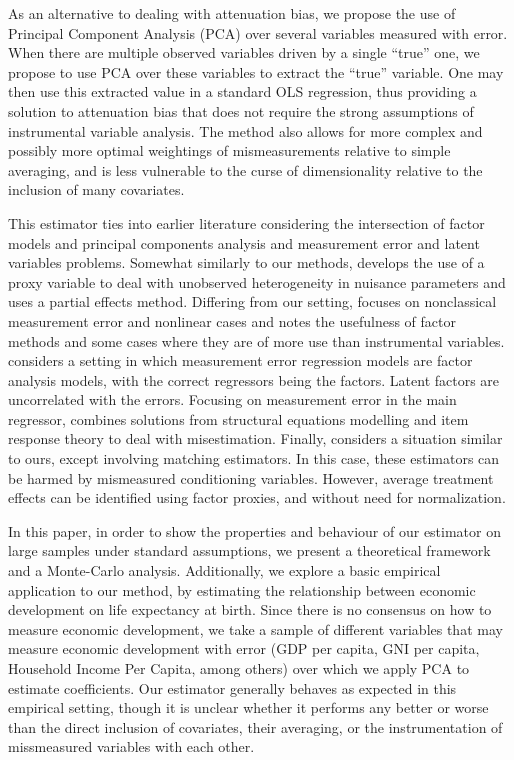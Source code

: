 \documentclass[10pt]{article}
\begin{document}
        As an alternative to dealing with attenuation bias, we propose the use of Principal Component Analysis (PCA) over several variables measured with error. When there are multiple observed variables driven by a single ``true'' one, we propose to use PCA over these variables to extract the ``true'' variable. One may then use this extracted value in a standard OLS regression, thus providing a solution to attenuation bias that does not require the strong assumptions of instrumental variable analysis. The method also allows for more complex and possibly more optimal weightings of mismeasurements relative to simple averaging, and is less vulnerable to the curse of dimensionality relative to the inclusion of many covariates.

        This estimator ties into earlier literature considering the intersection of factor models and principal components analysis and measurement error and latent variables problems. Somewhat similarly to our methods, \cite{nagasawa_identication_2020} develops the use of a proxy variable to deal with unobserved heterogeneity in nuisance parameters and uses a partial effects method. Differing from our setting, \cite{schennach_recent_2016} focuses on nonclassical measurement error and nonlinear cases and notes the usefulness of factor methods and some cases where they are of more use than instrumental variables. \cite{wegge_local_1996} considers a setting in which measurement error regression models are factor analysis models, with the correct regressors being the factors. Latent factors are uncorrelated with the errors. Focusing on measurement error in the main regressor, \cite{schofield_correcting_2015} combines solutions from structural equations modelling and item response theory to deal with misestimation. Finally, \cite{heckman_matching_2010} considers a situation similar to ours, except involving matching estimators. In this case, these estimators can be harmed by mismeasured conditioning variables. However, average treatment effects can be identified using factor proxies, and without need for normalization.

        In this paper, in order to show the properties and behaviour of our estimator on large samples under standard assumptions, we present a theoretical framework and a Monte-Carlo analysis. Additionally, we explore a basic empirical application to our method, by estimating the relationship between economic development on life expectancy at birth. Since there is no consensus on how to measure economic development, we take a sample of different variables that may measure economic development with error (GDP per capita, GNI per capita, Household Income Per Capita, among others) over which we apply PCA to estimate coefficients. Our estimator generally behaves as expected in this empirical setting, though it is unclear whether it performs any better or worse than the direct inclusion of covariates, their averaging, or the instrumentation of missmeasured variables with each other.
\end{document}

